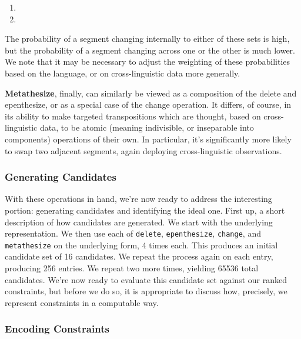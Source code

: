 \documentclass[12pt]{article}
\begin{document}
\begin{enumerate}
    \item {}
    \item {}
\end{enumerate}

The probability of a segment changing internally to either of these sets is
high, but the probability of a segment changing across one or the other is much
lower. We note that it may be necessary to adjust the weighting of these
probabilities based on the language, or on cross-linguistic data more generally.

\textbf{Metathesize}, finally, can similarly be viewed as a composition of the
delete and epenthesize, or as a special case of the change operation. It
differs, of course, in its ability to make targeted transpositions which are
thought, based on cross-linguistic data, to be atomic (meaning indivisible, or
inseparable into components) operations of their own. In particular, it's
significantly more likely to swap two adjacent segments, again deploying
cross-linguistic observations.

\subsubsection{Generating Candidates}

With these operations in hand, we're now ready to address the interesting
portion: generating candidates and identifying the ideal one. First up, a short
description of how candidates are generated. We start with the underlying
representation. We then use each of \texttt{delete}, \texttt{epenthesize},
\texttt{change}, and \texttt{metathesize} on the underlying form, 4 times each.
This produces an initial candidate set of 16 candidates. We repeat the process
again on each entry, producing 256 entries. We repeat two more times, yielding
65536 total candidates. We're now ready to evaluate this candidate set against
our ranked constraints, but before we do so, it is appropriate to discuss how,
precisely, we represent constraints in a computable way.

\subsubsection{Encoding Constraints}
\end{document}
